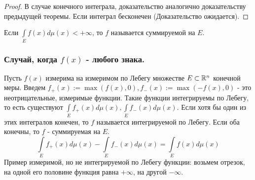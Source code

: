 \begin{proof}
В случае конечного интеграла, доказательство аналогично доказательству предыдущей теоремы. Если интеграл бесконечен (Доказательство ожидается).
\end{proof}

\begin{Def}
Если $\int\limits_E f(x)d\mu(x) < +\infty$, то $f$ называется суммируемой на $E$.
\end{Def}

\subsubsection{Случай, когда $f(x)$ - любого знака.}
Пусть $f(x)$ измерима на измеримом по Лебегу множестве $E \subset \R^n$ конечной меры. Введем $f_+(x):=\max(f(x), 0), f_-(x):=\max(-f(x), 0)$ - это неотрицательные, измеримые функции. Такие функции интегрируемы по Лебегу, то есть существуют $\int\limits_E f_+(x)d\mu(x), \int\limits_E f_-(x)d\mu(x)$. Если хотя бы один из этих интегралов конечен, то $f$ называется интегрируемой по Лебегу. Если оба конечны, то $f$ - суммируемая на $E$.
$$\int\limits_E f_+(x)d\mu(x)- \int\limits_E f_-(x)d\mu(x) = \int\limits_E f(x)d\mu(x)$$
Пример измеримой, но не интегрируемой по Лебегу функции: возьмем отрезок, на одной его половине функция равна $+\infty$, на другой $-\infty$.


